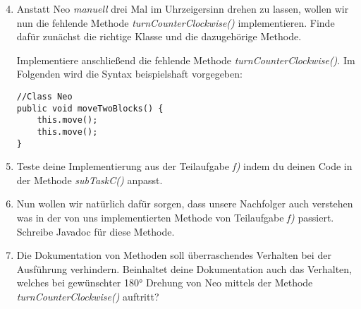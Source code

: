 \begin{enumerate}[label=\alph*)] \setcounter{enumi}{3}
    \item Anstatt Neo \textit{manuell} drei Mal im Uhrzeigersinn drehen zu lassen, wollen wir nun die fehlende Methode \textit{turnCounterClockwise()}
    implementieren. Finde dafür zunächst die richtige Klasse und die dazugehörige Methode. \par
    Implementiere anschließend die fehlende Methode \textit{turnCounterClockwise()}. Im Folgenden wird die Syntax beispielshaft vorgegeben:
    \begin{lstlisting}
//Class Neo
public void moveTwoBlocks() {
    this.move();
    this.move();
}
    \end{lstlisting}
    \item Teste deine Implementierung aus der Teilaufgabe \textit{f)} indem du deinen Code in der Methode \textit{subTaskC()} anpasst.
    \item Nun wollen wir natürlich dafür sorgen, dass unsere Nachfolger auch verstehen was in der von uns implementierten Methode von 
    Teilaufgabe \textit{f)} passiert. Schreibe Javadoc für diese Methode.
    \item Die Dokumentation von Methoden soll überraschendes Verhalten bei der Ausführung verhindern. Beinhaltet deine Dokumentation auch 
    das Verhalten, welches bei gewünschter 180° Drehung von Neo mittels der Methode \textit{turnCounterClockwise()} auftritt?
\end{enumerate}